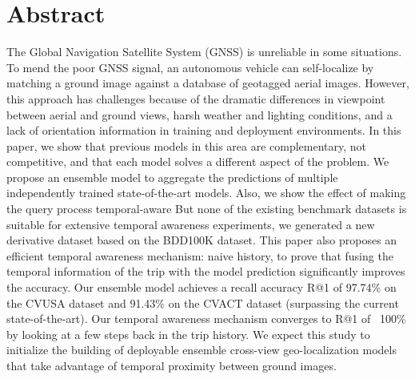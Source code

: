 \documentclass[10pt,letterpaper]{article}
\begin{document}
\section*{Abstract}
The Global Navigation Satellite System (GNSS) is unreliable in some situations. To mend the poor GNSS signal, an autonomous vehicle can self-localize by matching a ground image against a database of geotagged aerial images. However, this approach has challenges  because of the dramatic differences in viewpoint between aerial and ground views, harsh weather and lighting conditions, and a lack of orientation information in training and deployment environments. In this paper, we show that previous models in this area are complementary, not competitive, and that each model solves a different aspect of the problem. We propose an ensemble model to aggregate the predictions of multiple independently trained state-of-the-art models. Also, we show the effect of making the query process temporal-aware  But none of the existing benchmark datasets is suitable for extensive temporal awareness experiments, we generated a new derivative dataset based on the BDD100K dataset. This paper also proposes an efficient temporal awareness mechanism: naive history, to prove that fusing the temporal information of the trip with the model prediction significantly improves the accuracy. Our ensemble model achieves a recall accuracy R@1 of 97.74\% on the CVUSA dataset and 91.43\% on the CVACT dataset (surpassing the current state-of-the-art). Our temporal awareness mechanism converges to R@1 of ~100\% by looking at a few steps back in the trip history. We expect this study to initialize the building of deployable ensemble cross-view geo-localization models that take advantage of temporal proximity between ground images.

\linenumbers

\end{document}
